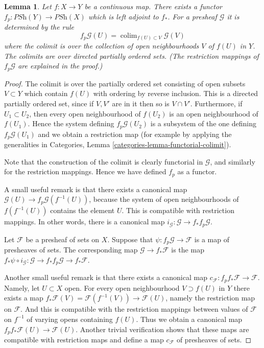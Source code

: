 \documentclass{stacks-project}
\theoremstyle{plain}
\newtheorem{lemma}[subsection]{Lemma}
\theoremstyle{definition}
\theoremstyle{remark}
\numberwithin{equation}{subsection}
\def\colim{\mathop{\mathrm{colim}}\nolimits}
\begin{document}
\begin{lemma}
\label{lemma-pullback-presheaves}
Let $f : X \to Y$ be a continuous map.
There exists a functor
$f_p : \textit{PSh}(Y) \to \textit{PSh}(X)$
which is left adjoint to $f_*$. For a presheaf
$\mathcal{G}$ it is determined by the rule
$$
f_p\mathcal{G}(U) = \colim_{f(U) \subset V} \mathcal{G}(V)
$$
where the colimit is over the collection of open neighbourhoods
$V$ of $f(U)$ in $Y$. The colimits are over
directed partially ordered sets.
(The restriction mappings of $f_p\mathcal{G}$ are explained in the proof.)
\end{lemma}

\begin{proof}
The colimit is over the partially ordered set consisting of open subsets
$V \subset Y$ which contain $f(U)$ with ordering by reverse inclusion.
This is a directed partially ordered set, since if $V, V'$ are in it then
so is $V \cap V'$. Furthermore, if
$U_1 \subset U_2$, then every open neighbourhood of $f(U_2)$
is an open neighbourhood of $f(U_1)$. Hence the system defining
$f_p\mathcal{G}(U_2)$ is a subsystem of the one defining
$f_p\mathcal{G}(U_1)$ and we obtain a restriction map (for
example by applying the generalities in Categories,
Lemma \ref{categories-lemma-functorial-colimit}).

\medskip\noindent
Note that the construction of the colimit is clearly functorial
in $\mathcal{G}$, and similarly for the restriction mappings.
Hence we have defined $f_p$ as a functor.

\medskip\noindent
A small useful remark is that there exists
a canonical map $\mathcal{G}(U) \to f_p\mathcal{G}(f^{-1}(U))$,
because the system of open neighbourhoods
of $f(f^{-1}(U))$ contains the element $U$. This is compatible
with restriction mappings. In other words, there is a
canonical map $i_\mathcal{G} : \mathcal{G} \to f_* f_p \mathcal{G}$.

\medskip\noindent
Let $\mathcal{F}$ be a presheaf of sets on $X$.
Suppose that $\psi : f_p\mathcal{G} \to \mathcal{F}$
is a map of presheaves of sets. The corresponding map
$\mathcal{G} \to f_*\mathcal{F}$ is the map
$f_*\psi \circ i_\mathcal{G} :
\mathcal{G} \to f_* f_p \mathcal{G} \to f_* \mathcal{F}$.

\medskip\noindent
Another small useful remark is that there exists a
canonical map $c_\mathcal{F} : f_p f_* \mathcal{F} \to \mathcal{F}$.
Namely, let $U \subset X$ open.
For every open neighbourhood $V \supset f(U)$ in $Y$
there exists a map
$f_*\mathcal{F}(V) = \mathcal{F}(f^{-1}(V))\to \mathcal{F}(U)$,
namely the restriction map on $\mathcal{F}$. And this is compatible
with the restriction mappings between values of $\mathcal{F}$
on $f^{-1}$ of varying opens containing $f(U)$. Thus we obtain
a canonical map $f_p f_* \mathcal{F}(U) \to \mathcal{F}(U)$.
Another trivial verification shows that these maps are compatible
with restriction maps and define a map $c_\mathcal{F}$
of presheaves of sets.


\end{proof}
\end{document}
